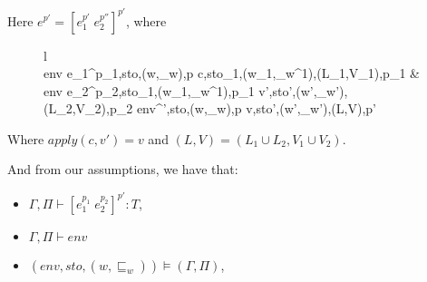 \item[\runa{App}] Here $e^{p'}=\left[e_1^{p'}\;e_2^{p''}\right]^{p'}$, where
\begin{figure}[H]
	\setlength\tabcolsep{8pt}
	\begin{tabular}{l}
		\InfName{App}\\[0.2cm]
		\inference[]
				{env \vdash \left\langle e_1^{p_1},sto,(w,\sqsubseteq_w),p \right\rangle \rightarrow \left\langle c,sto_1,(w_1,\sqsubseteq_w^1),(L_1,V_1),p_1 \right\rangle &\\
				env \vdash \left\langle e_2^{p_2},sto_1,(w_1,\sqsubseteq_w^1),p_1 \right\rangle \rightarrow \left\langle v',sto',(w',\sqsubseteq_w'),(L_2,V_2),p_2 \right\rangle}
				{env\vdash \left\langle \left[e_1^{p_1}\;e_2^{p_2}\right]^{'},sto,(w,\sqsubseteq_w),p \right\rangle \rightarrow \left\langle v,sto',(w',\sqsubseteq_w'),(L,V),p' \right\rangle}
	\end{tabular}
\end{figure}
Where $apply(c,v')=v$ and $(L,V)=(L_1\cup L_2,V_1\cup V_2)$.

And from our assumptions, we have that:
\begin{itemize}
	\item $\Gamma,\Pi\vdash \left[e_1^{p_1}\;e_2^{p_2}\right]^{p'}:T$,
	\item $\Gamma,\Pi\vdash env$
	\item $(env,sto,(w,\sqsubseteq_w))\models(\Gamma,\Pi)$,
\end{itemize}

